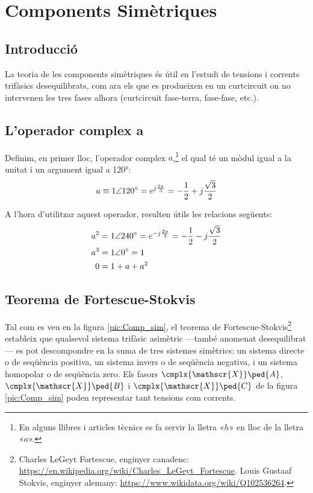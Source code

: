 
\chapter{Components Simètriques}  \label{sec:ch-comp-sim}

\section{Introducció}
La teoria de les components simètriques és útil en l'estudi de
tensions i corrents trifàsics
 desequilibrats, com ara els que es produeixen en un curtcircuit on no intervenen les tres
 fases alhora (curtcircuit fase-terra, fase-fase, etc.).

\section{L'operador complex a}

Definim, en primer lloc, l'operador complex $a$,\footnote{En alguns llibres i articles tècnics es fa servir la lletra «$h$» en lloc de la lletra «$a$».} el qual té un mòdul
igual a la unitat i un argument igual a \ang{120}: \begin{equation}
   a \equiv \complexnum{1:120} = e^{j\frac{2\pi}{3}} = -\frac{1}{2} + j \frac{\sqrt{3}}{2}
\end{equation}

A l'hora d'utilitzar aquest operador, resulten útils les relacions
següents:
\begin{subequations}
\begin{align}
    a^2 &= \complexnum{1:240} = e^{-j\frac{2\pi}{3}} = -\frac{1}{2} - j \frac{\sqrt{3}}{2} \\
    a^3 &= \complexnum{1:0} = 1 \\
  	0 &=   1+ a + a^2 
 \end{align}
\end{subequations}

\section{\texorpdfstring{Teorema de Fortescue-Stokvis}{Teorema de Fortescue-Stokvis}}

Tal com es veu en la figura \vref{pic:Comp_sim}, el teorema de Fortescue-Stokvis\footnote{Charles LeGeyt Fortescue, enginyer canadenc: \href{https://en.wikipedia.org/wiki/Charles_LeGeyt_Fortescue}{https:/\!\!/en.wikipedia.org/wiki/Charles\_LeGeyt\_Fortescue}. Louis Gustaaf Stokvis, enginyer alemany: \href{https://www.wikidata.org/wiki/Q102536264}{https:/\!\!/www.wikidata.org/wiki/Q102536264}.}
estableix que qualsevol sistema trifàsic asimètric ---també anomenat
desequilibrat---  es pot descompondre  en la suma de tres sistemes
simètrics: un sistema directe o de seqüència positiva, un sistema
invers o de seqüència negativa, i un sistema homopolar o de
seqüència zero. Els fasors $\cmplx{\mathscr{X}}\ped{A}$,
$\cmplx{\mathscr{X}}\ped{B}$ i $\cmplx{\mathscr{X}}\ped{C}$ de la figura \ref{pic:Comp_sim} poden representar tant
tensions com corrents.

